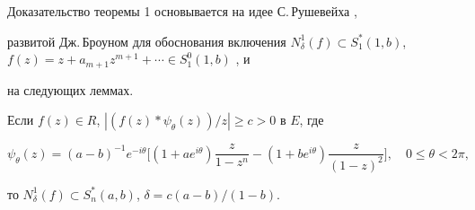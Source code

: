  


Доказательство теоремы 1 основывается на идее С.\,Рушевейха \cite{5}, 


развитой Дж.\,Броуном для обоснования включения $N^1_\delta(f)\subset 


S^*_1(1,b)$, $f(z)=z+a_{m+1}z^{m+1}+\dotsb\in S^0_1(1,b)$ \cite{8}, и 


на следующих леммах. 


 


\begin{lem} 


Если $f(z)\in R$, $|(f(z)*\psi_\theta(z))/z|\ge c>0$ в $E$, где 


\begin{equation} 


\psi_\theta(z)=(a-b)^{-1}e^{-i\theta}\bigg[ 


(1+ae^{i\theta})\frac{z}{1-z^n}-(1+be^{i\theta}) 


\frac{z}{(1-z)^2}\bigg],\quad 0\le\theta<2\pi, 


\end{equation} 


то $N^1_\delta(f)\subset S^*_n(a,b)$, $\delta=c(a-b)/(1-b)$. 


\end{lem} 


 


